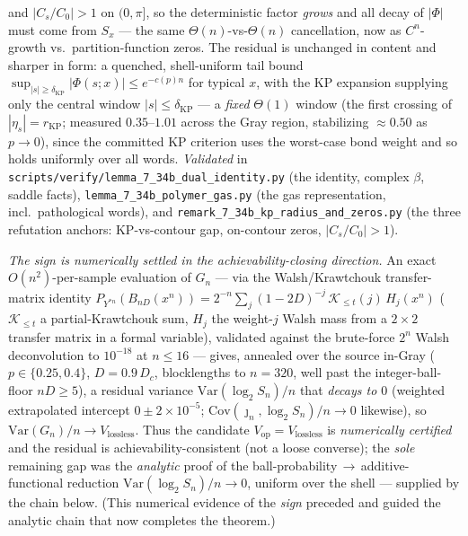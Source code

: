\documentclass[
]{article}
\begin{document}
and $|C_s/C_0|>1$ on $(0,\pi]$, so the deterministic factor \emph{grows} and all decay of $|\Phi|$ must
come from $S_x$ --- the same $\Theta(n)$-vs-$\Theta(n)$ cancellation, now as $C^n$-growth vs.\
partition-function zeros. The residual is unchanged in content and sharper in form: a quenched,
shell-uniform tail bound $\sup_{|s|\ge\delta_{\mathrm{KP}}}|\Phi(s;x)|\le e^{-c(p)n}$ for typical $x$,
with the KP expansion supplying only the central window $|s|\le\delta_{\mathrm{KP}}$ --- a \emph{fixed}
$\Theta(1)$ window (the first crossing of $|\eta_s|=r_{\mathrm{KP}}$; measured $0.35$--$1.01$ across the
Gray region, stabilizing $\approx0.50$ as $p\to0$), since the committed KP criterion uses the worst-case
bond weight and so holds uniformly over all words. \emph{Validated} in
\texttt{scripts/verify/lemma\_7\_34b\_dual\_identity.py} (the identity, complex $\beta$, saddle facts),
\texttt{lemma\_7\_34b\_polymer\_gas.py} (the gas representation, incl.\ pathological words), and
\texttt{remark\_7\_34b\_kp\_radius\_and\_zeros.py} (the three refutation anchors: KP-vs-contour gap,
on-contour zeros, $|C_s/C_0|>1$).

\emph{The sign is numerically settled in the achievability-closing direction.} An exact
$O(n^2)$-per-sample evaluation of $G_n$ --- via the Walsh/Krawtchouk transfer-matrix identity
$P_{Y^{*n}}(B_{nD}(x^n))=2^{-n}\sum_{j}(1-2D)^{-j}\,\mathcal K_{\le t}(j)\,H_j(x^n)$ ($\mathcal K_{\le
t}$ a partial-Krawtchouk sum, $H_j$ the weight-$j$ Walsh mass from a $2\times2$ transfer matrix in a
formal variable), validated against the brute-force $2^n$ Walsh deconvolution to $10^{-18}$ at $n\le16$
--- gives, annealed over the source in-Gray ($p\in\{0.25,0.4\}$, $D=0.9\,D_c$, blocklengths to
$n=320$, well past the integer-ball-floor $nD\ge5$), a residual variance $\mathrm{Var}(\log_2 S_n)/n$
that \emph{decays to $0$} (weighted extrapolated intercept $0\pm2\times10^{-5}$; $\mathrm{Cov}(\jmath_n,
\log_2 S_n)/n\to0$ likewise), so $\mathrm{Var}(G_n)/n\to V_{\mathrm{lossless}}$. Thus the candidate
$V_{\mathrm{op}}=V_{\mathrm{lossless}}$ is \emph{numerically certified} and the residual is
achievability-consistent (not a loose converse); the \emph{sole} remaining gap was the \emph{analytic}
proof of the ball-probability$\,\to\,$additive-functional reduction $\mathrm{Var}(\log_2 S_n)/n\to0$,
uniform over the shell --- supplied by the chain below. (This numerical evidence of the \emph{sign}
preceded and guided the analytic chain that now completes the theorem.)
\end{document}
